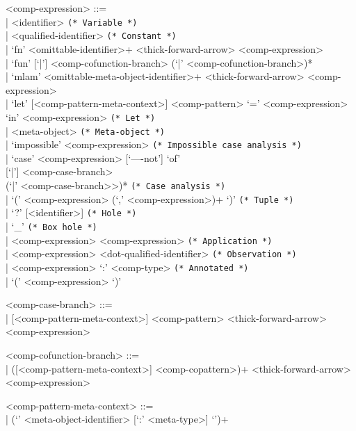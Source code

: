 \documentclass[11pt]{article}
\begin{document}
\begin{grammar}
<comp-expression> ::= \hfill\\
| <identifier> \hfill \texttt{(* Variable *)}\\
| <qualified-identifier> \hfill \texttt{(* Constant *)}\\
| `fn' <omittable-identifier>+ <thick-forward-arrow> <comp-expression>\\
| `fun' [`|'] <comp-cofunction-branch> (`|' <comp-cofunction-branch>)*\\
| `mlam' <omittable-meta-object-identifier>+ <thick-forward-arrow> <comp-expression>\\
| `let' [<comp-pattern-meta-context>] <comp-pattern> `=' <comp-expression> \\
  `in' <comp-expression> \hfill \texttt{(* Let *)}\\
| <meta-object> \hfill \texttt{(* Meta-object *)}\\
| `impossible' <comp-expression> \hfill \texttt{(* Impossible case analysis *)} \\
| `case' <comp-expression> [`----not'] `of'\\{}
  [`|'] <comp-case-branch>\\
  (`|' <comp-case-branch>>)* \hfill \texttt{(* Case analysis *)}\\
| `(' <comp-expression> (`,' <comp-expression>)+ `)' \hfill \texttt{(* Tuple *)}\\
| `?' [<identifier>] \hfill \texttt{(* Hole *)}\\
| `_' \hfill \texttt{(* Box hole *)}\\
| <comp-expression> <comp-expression> \hfill \texttt{(* Application *)}\\
| <comp-expression> <dot-qualified-identifier> \hfill \texttt{(* Observation *)}\\
| <comp-expression> `:' <comp-type> \hfill \texttt{(* Annotated *)}\\
| `(' <comp-expression> `)'

<comp-case-branch> ::= \hfill\\
| [<comp-pattern-meta-context>] <comp-pattern> <thick-forward-arrow> <comp-expression>

<comp-cofunction-branch> ::= \hfill\\
| ([<comp-pattern-meta-context>] <comp-copattern>)+ <thick-forward-arrow> <comp-expression>

<comp-pattern-meta-context> ::= \hfill\\
| (`{' <meta-object-identifier> [`:' <meta-type>] `}')+


\end{grammar}
\end{document}
